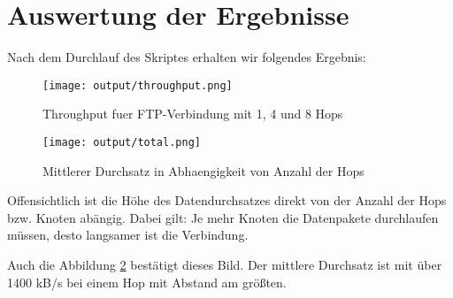 \documentclass[12pt,a4paper,titlepage]{article}
\begin{document}
\section{Auswertung der Ergebnisse}

Nach dem Durchlauf des Skriptes erhalten wir folgendes Ergebnis:

\begin{figure}[h]
	\centering
% 	
	\texttt{[image: output/throughput.png]}
	\caption{Throughput fuer FTP-Verbindung mit 1, 4 und 8 Hops}
	\label{Durchsatz}
\end{figure}

\begin{figure}[h]
	\centering
% 	
	\texttt{[image: output/total.png]}
	\caption{Mittlerer Durchsatz in Abhaengigkeit von Anzahl der Hops}
	\label{Durchsatz2}
\end{figure}

Offensichtlich ist die Höhe des Datendurchsatzes direkt von der Anzahl der Hops bzw. Knoten abängig. Dabei gilt: Je mehr Knoten die Datenpakete durchlaufen müssen, desto langsamer ist die Verbindung.

Auch die Abbildung \ref{Durchsatz2} bestätigt dieses Bild. Der mittlere Durchsatz ist mit über 1400 kB/s bei einem Hop mit Abstand am größten.
\end{document}
